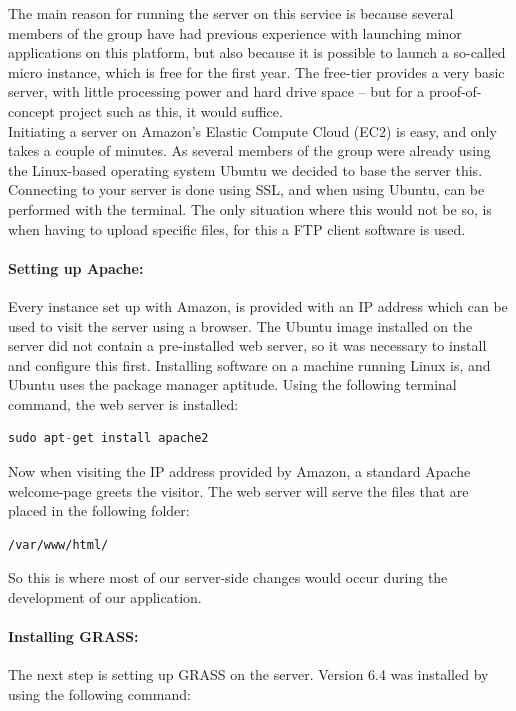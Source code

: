 The main reason for running the server on this service is because several members of the group have had previous experience with launching minor applications on this platform, but also because it is possible to launch a so-called micro instance, which is free for the first year. The free-tier provides a very basic server, with little processing power and hard drive space – but for a proof-of-concept project such as this, it would suffice. \\
Initiating a server on Amazon's Elastic Compute Cloud (EC2) is easy, and only takes a couple of minutes. As several members of the group were already using the Linux-based operating system Ubuntu we decided to base the server this.\\
Connecting to your server is done using SSL, and when using Ubuntu, can be performed with the terminal. The only situation where this would not be so, is when having to upload specific files, for this a FTP client software is used.

\paragraph{Setting up Apache:}Every instance set up with Amazon, is provided with an IP address which can be used to visit the server using a browser. The Ubuntu image installed on the server did not contain a pre-installed web server, so it was necessary to install and configure this first.
Installing software on a machine running Linux is, and Ubuntu uses the package manager aptitude. Using the following terminal command, the web server is installed:

\begin{lstlisting}[language=Python]
sudo apt-get install apache2 
\end{lstlisting}

Now when visiting the IP address provided by Amazon, a standard Apache welcome-page greets the visitor.
The web server will serve the files that are placed in the following folder:

\begin{lstlisting}
/var/www/html/
\end{lstlisting}

So this is where most of our server-side changes would occur during the development of our application.\\

\paragraph{Installing GRASS:} The next step is setting up GRASS on the server. Version 6.4 was installed by using the following command:

